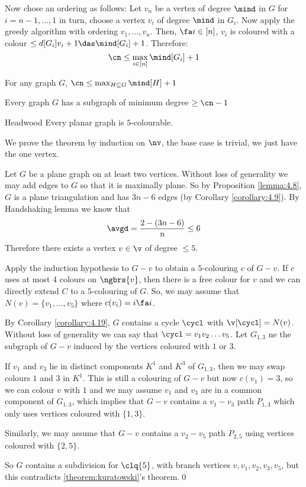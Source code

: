 Now chose an ordering as follows: Let $v_n$ be a vertex of degree $\mind$ in $G$ for $i = n - 1, \dots, 1$ in turn, choose a vertex $v_i$ of degree $\mind$ in $G_i$. Now apply the greedy algorithm with ordering $v_1, \dots, v_n$. Then, $\fa i \in [n]$, $v_i$ is coloured with a colour $\leq d[G_i]{v_i} + 1 \das \mind[G_i] + 1$. Therefore:
\begin{equation*}
    \cn \leq \max_{i \in [n]}\mind[G_i] + 1
\end{equation*}
\begin{customproposition}{6.2}
\label{proposition:6.2}
    For any graph $G$, $\cn \leq \max_{H \subseteq G} \mind[H] + 1$
\end{customproposition}
\begin{customcorollary}{6.3}
\label{corollary:6.3}
    Every graph $G$ has a subgraph of minimum degree $\geq \cn - 1$
\end{customcorollary}
\begin{customtheorem}{Headwood}
\label{theorem:headwood}
    Every planar graph is $5$-colourable.
\end{customtheorem}
\begin{prf}
    We prove the theorem by induction on $\nv$, the base case is trivial, we just have the one vertex.

    Let $G$ be a plane graph on at least two vertices. Without loss of generality we may add edges to $G$ so that it is maximally plane. So by Proposition \ref{lemma:4.8}, $G$ is a plane triangulation and has $3n - 6$ edges (by Corollary \ref{corollary:4.9}). By Handshaking lemma we know that
    \begin{equation*}
        \avgd = \frac{2 - (3n - 6)}{n} \leq 6
    \end{equation*}
    Therefore there exists a vertex $v \in \v$ of degree $\leq 5$.

    Apply the induction hypothesis to $G - v$ to obtain a $5$-colouring $c$ of $G - v$. If $c$ uses at most $4$ colours on $\ngbrs{v}$, then there is a free colour for $v$ and we can directly extend $C$ to a $5$-colouring of $G$. So, we may assume that $N(v) = \{v_1, \dots, v_5\}$ where $c(v_i) = i \fa i$.

    By Corollary \ref{corollary:4.19}, $G$ contains a cycle $\cycl$ with $\v[\cycl] = N(v)$. Without loss of generality we can say that $\cycl = v_1v_2\dots v_5$. Let $G_{1, 3}$ ne the subgraph of $G - v$ induced by the vertices coloured with $1$ or $3$.

    If $v_1$ and $v_3$ lie in distinct components $K^1$ and $K^3$ of $G_{1, 3}$, then we may swap colours $1$ and $3$ in $K^1$. This is still a colouring of $G - v$ but now $c(v_1) = 3$, so we can colour $v$ with $1$ and we may assume $v_1$ and $v_3$ are in a common component of $G_{1, 3}$, which implies that $G - v$ contains a $v_1 - v_3$ path $P_{1, 3}$ which only uses vertices coloured with $\{1, 3\}$.

    Similarly, we may assume that $G - v$ contains a $v_2 - v_5$ path $P_{2, 5}$ using vertices coloured with $\{2, 5\}$.

    So $G$ contains a subdivision for $\clq{5}$, with branch vertices $v, v_1, v_2, v_3, v_5$, but this contradicts \ref{theorem:kuratowski}'s theorem.\qed
\end{prf}
